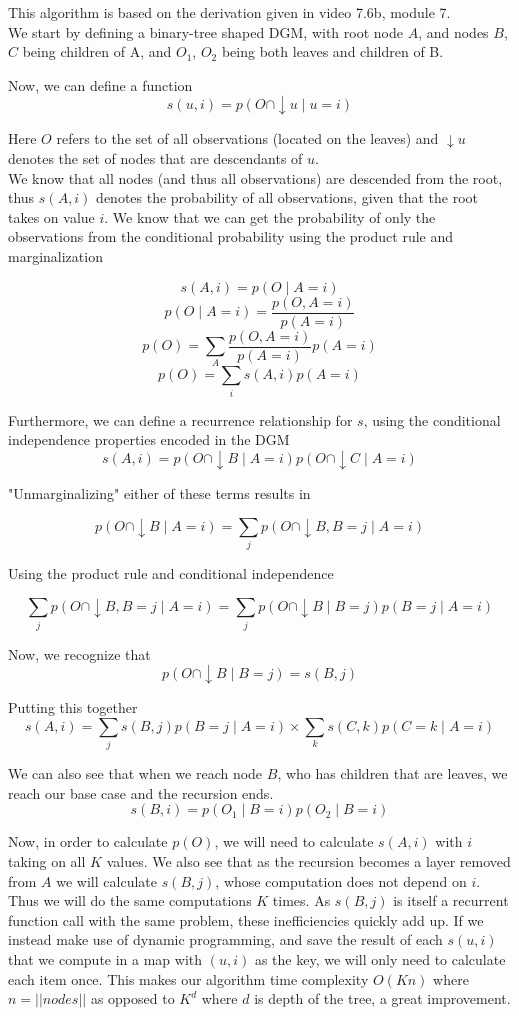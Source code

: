 \documentclass[11pt,a4paper]{article}
\begin{document}
This algorithm is based on the derivation given in video 7.6b, module 7.\\

We start by defining a binary-tree shaped DGM, with root node $A$,  and nodes $B$, $C$ being children of A, and $O_{1}$, $O_{2}$ being both leaves and children of B.

Now, we can define a function $$s(u, i) = p(O \cap\downarrow u \mid u = i) $$

Here $O$ refers to the set of all observations (located on the leaves) and $\downarrow u$ denotes the set of nodes that are descendants of $u$.\\

We know that all nodes (and thus all observations) are descended from the root, thus $s(A, i)$ denotes the probability of all observations, given that the root takes on value $i$. We know that we can get the probability of only the observations from the conditional probability using the product rule and marginalization

$$s(A, i) = p(O \mid A = i)$$
$$p(O \mid A = i) = \frac{p(O, A = i)}{p(A = i)} $$
$$p(O) = \sum_{A} \frac{p(O, A = i)}{p(A = i)}p(A = i)$$
$$p(O) = \sum_{i} s(A, i)p(A=i)$$

Furthermore, we can define a recurrence relationship for $s$, using the conditional independence properties encoded in the DGM
$$s(A, i) = p(O \cap\downarrow B \mid A = i)p(O \cap\downarrow C \mid A = i)$$

"Unmarginalizing" either of these terms results in

$$p(O \cap\downarrow B \mid A = i) = \sum_{j} p(O \cap\downarrow B, B = j \mid A = i)$$

Using the product rule and conditional independence

$$ \sum_{j} p(O \cap\downarrow B, B = j \mid A = i) =  \sum_{j} p(O \cap\downarrow B \mid B = j)p(B = j \mid A = i)$$

Now, we recognize that
$$ p(O \cap\downarrow B \mid B = j) = s(B, j)$$

Putting this together
$$s(A, i) = \sum_{j}s(B, j)p(B = j \mid A = i) \times \sum_{k} s(C, k)p(C = k \mid A = i)$$

We can also see that when we reach node $B$, who has children that are leaves, we reach our base case and the recursion ends.
$$s(B, i) = p(O_{1} \mid B = i)p(O_{2} \mid B = i)$$

Now, in order to calculate $p(O)$, we will need to calculate $s(A, i)$ with $i$ taking on all $K$ values. We also see that as the recursion becomes a layer removed from $A$ we will calculate $s(B, j)$, whose computation does not depend on $i$. Thus we will do the same computations $K$ times. As $s(B, j)$ is itself a recurrent function call with the same problem, these inefficiencies quickly add up. If we instead make use of dynamic programming, and save the result of each $s(u, i)$ that we compute in a map with $(u, i)$ as the key, we will only need to calculate each item once. This makes our algorithm time complexity  $O(Kn)$ where $n= ||nodes||$ as opposed to $K^{d}$ where $d$ is depth of the tree, a great improvement.
\end{document}
